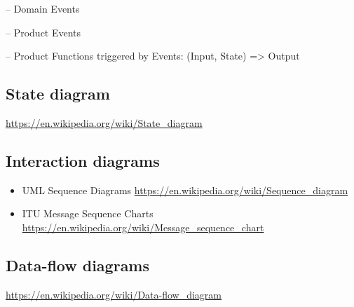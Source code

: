 -- Domain Events

-- Product Events

-- Product Functions triggered by Events: (Input, State) => Output

\subsection{State diagram}%
\url{https://en.wikipedia.org/wiki/State_diagram} 

\subsection{Interaction diagrams}

\begin{itemize}
  \item UML Sequence Diagrams \url{https://en.wikipedia.org/wiki/Sequence_diagram}
  \item ITU Message Sequence Charts \url{https://en.wikipedia.org/wiki/Message_sequence_chart}
\end{itemize}

\subsection{Data-flow diagrams}%
\url{https://en.wikipedia.org/wiki/Data-flow_diagram} 


